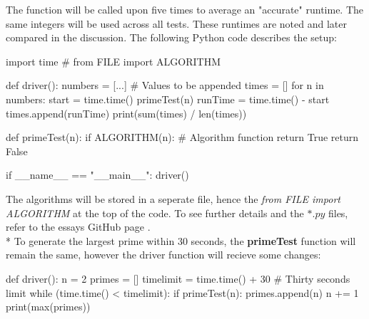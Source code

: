 \documentclass[main.tex]{subfiles}
\begin{document}
\vspace{10mm}

The function will be called upon five times to average an "accurate" runtime. The same integers will be used across all tests. These runtimes are noted and later compared in the discussion. The following Python code describes the setup:

\begin{python}
    import time
    # from FILE import ALGORITHM

    def driver():
        numbers = [...] # Values to be appended
        times = []
        for n in numbers:
            start = time.time()
            primeTest(n)
            runTime = time.time() - start
            times.append(runTime)
        print(sum(times) / len(times))

    def primeTest(n):
        if ALGORITHM(n): # Algorithm function
            return True
        return False

    if __name__ == "__main__":
        driver()
\end{python}

The algorithms will be stored in a seperate file, hence the \textit{from FILE import ALGORITHM} at the top of the code. To see further details and the $*.py$ files, refer to the essays GitHub page \cite{github}.
\newline
\\*
To generate the largest prime within $30$ seconds, the \textbf{primeTest} function will remain the same, however the driver function will recieve some changes:

\begin{python}
    def driver():
        n = 2
        primes = []
        timelimit = time.time() + 30  # Thirty seconds limit
        while (time.time() < timelimit):
            if primeTest(n):
                primes.append(n)
            n += 1
        print(max(primes))
\end{python}
\end{document}
